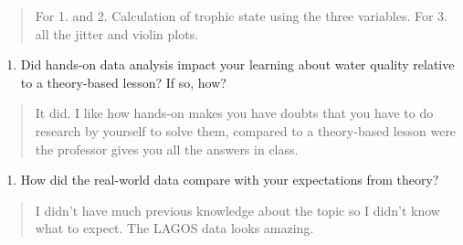 \documentclass[]{article}
\providecommand{\tightlist}{%
  \setlength{\itemsep}{0pt}\setlength{\parskip}{0pt}}
\begin{document}
\begin{quote}
For 1. and 2. Calculation of trophic state using the three variables.
For 3. all the jitter and violin plots.
\end{quote}

\begin{enumerate}
\def\labelenumi{\arabic{enumi}.}
\setcounter{enumi}{13}
\tightlist
\item
  Did hands-on data analysis impact your learning about water quality
  relative to a theory-based lesson? If so, how?
\end{enumerate}

\begin{quote}
It did. I like how hands-on makes you have doubts that you have to do
research by yourself to solve them, compared to a theory-based lesson
were the professor gives you all the answers in class.
\end{quote}

\begin{enumerate}
\def\labelenumi{\arabic{enumi}.}
\setcounter{enumi}{14}
\tightlist
\item
  How did the real-world data compare with your expectations from
  theory?
\end{enumerate}

\begin{quote}
I didn't have much previous knowledge about the topic so I didn't know
what to expect. The LAGOS data looks amazing.
\end{quote}
\end{document}

